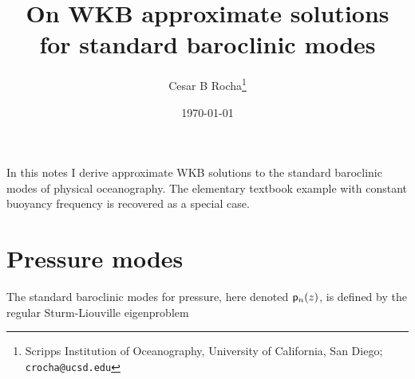 \documentclass[11pt]{article}
\title{On WKB approximate solutions for standard baroclinic modes}
\author{Cesar B Rocha\thanks{Scripps Institution of Oceanography, University of California, San Diego; \texttt{crocha@ucsd.edu}}}
\date{\today}
\begin{document}


\maketitle

In this notes I derive approximate WKB solutions to the standard baroclinic modes of physical oceanography. The elementary textbook example with constant buoyancy frequency is recovered as a special case. 

\section{Pressure modes}

The standard baroclinic modes for pressure, here denoted $\sp_n(z)$,  is defined by the regular Sturm-Liouville eigenproblem
\end{document}
